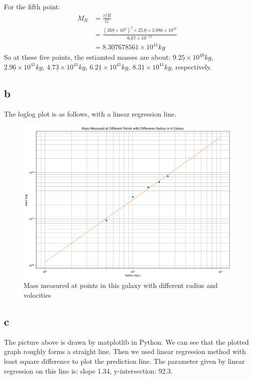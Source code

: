 \documentclass[11pt]{article}
\newcommand{\sci}[1]{\times 10^{#1}}
\begin{document}
For the fifth point:
$$
\begin{aligned}
M_R &= \frac{v_r^2 R}{G} \\
&= \frac{(26\underline{8} \sci{3})^2 \times 25.\underline{0} \times 3.086 \sci{19}}{6.67 \sci{-11}}\\
&= 8.3\underline{0}7678561 \sci{41} kg
\end{aligned}
$$
So at these five points, the estiamted masses are about:
$9.2\underline{5} \sci{40} kg$,
$2.9\underline{6} \sci{41} kg$,
$4.7\underline{3} \sci{41} kg$,
$6.2\underline{1} \sci{41} kg$,
$8.3\underline{1} \sci{41} kg$,
respectively.
\subsection*{b}

The loglog plot is as follows, with a linear regression line.
\begin{figure}[H]
\centerline{\includegraphics[scale=.5]{output.png}}
\caption{Mass measured at points in this galaxy with different radius and volocities}
\label{fig}
\end{figure}

\subsection*{c}
The picture above is drawn by matplotlib in Python.
We can see that the plotted graph roughly forms a straight line.
Then we used linear regression method with least square difference to plot the prediction line.
The parameter given by linear regression on this line is: 
slope 1.34, y-intersection: 92.3. 
\end{document}
